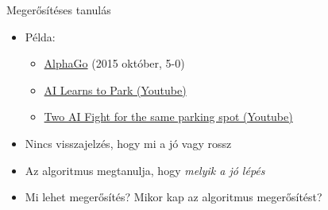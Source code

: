 \begin{frame}{Megerősítéses tanulás}
    \begin{itemize}
        \item Példa:
        \begin{itemize}
            \item \href{https://deepmind.com/research/case-studies/alphago-the-story-so-far}{AlphaGo} (2015 október, 5-0)
            \item \href{https://www.youtube.com/watch?v=VMp6pq6_QjI}{AI Learns to Park (Youtube)}
            \item \href{https://www.youtube.com/watch?v=CqYKhbyHFtA}{Two AI Fight for the same parking spot (Youtube)}
        \end{itemize}
        \item Nincs visszajelzés, hogy mi a jó vagy rossz
        \item Az algoritmus megtanulja, hogy {\it melyik a jó lépés}
        \item Mi lehet megerősítés? Mikor kap az algoritmus megerősítést?
    \end{itemize}
\end{frame}
